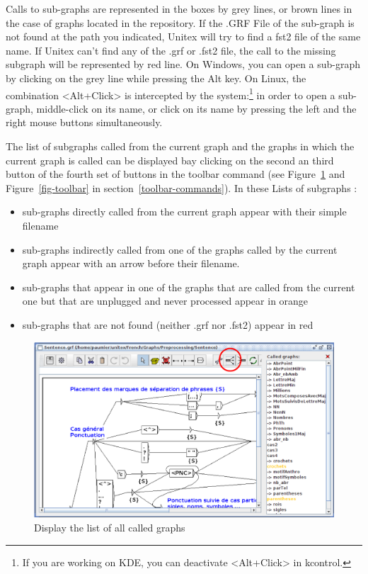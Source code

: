 \bigskip
\noindent Calls to sub-graphs are represented in the boxes by grey lines, or brown
lines in the case of graphs located in the repository. If the .GRF File of the sub-graph is not found at the path you indicated, Unitex will try to find a fst2 file of the same name. If Unitex can't find any of the .grf or .fst2 file, the call to the missing subgraph will be represented by red line. 
On Windows, you can open a sub-graph by clicking on the grey line while pressing the Alt key.
On Linux, the  combination <Alt+Click> is intercepted by the system:\footnote{If you are 
working on KDE, you can deactivate <Alt+Click> in kcontrol.} in order to open a
sub-graph, middle-click on its name, or click on its name by pressing the left and the right mouse buttons
simultaneously.

\bigskip
\noindent The list of subgraphs called from the current graph and the graphs in which the current graph is called can be displayed bay clicking on the second an third button of the fourth set of buttons in the toolbar command (see Figure~\ref{list-called-graphs} and
Figure~\ref{fig-toolbar} in section~\ref{toolbar-commands}).
In these Lists of subgraphs : 
\begin{itemize}
\item sub-graphs directly called from the current graph appear with their simple filename
\item sub-graphs indirectly called from one of the graphs called by the current graph appear with an arrow before their filename.
\item sub-graphs that appear in one of the graphs that are called from the current one but that are unplugged and never processed appear in orange
\item sub-graphs that are not found (neither .grf nor .fst2) appear in red
\end{itemize}

\begin{figure}[!h]
\begin{center}
\includegraphics[width=15.2cm]{resources/img/fig5-12b.png}
\caption{Display the list of all called graphs\label{list-called-graphs}}
\end{center}
\end{figure}

